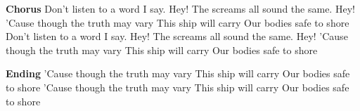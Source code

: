   \begin{chorus}{\textbf{Chorus}}
    Don't listen to a word I say. Hey!
    The screams all sound the same. Hey!
    'Cause though the truth may vary
    This ship will carry
    Our bodies safe to shore
    Don't listen to a word I say. Hey!
    The screams all sound the same. Hey!
    'Cause though the truth may vary
    This ship will carry
    Our bodies safe to shore
\end{chorus}

\begin{verse*}{\textbf{Ending}}
    'Cause though the truth may vary
    This ship will carry
    Our bodies safe to shore
    'Cause though the truth may vary
    This ship will carry
    Our bodies safe to shore
\end{verse*}

\endsong